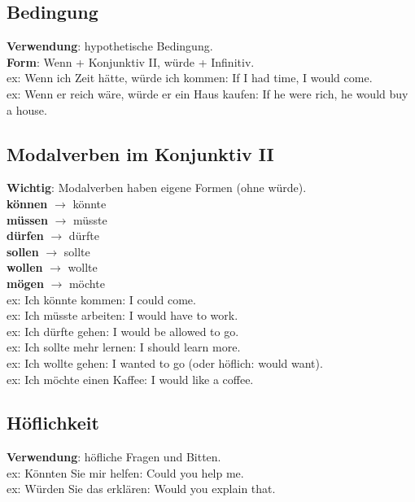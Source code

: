 \documentclass[a4paper]{article}
\begin{document}
        \subsection{Bedingung}
            \textbf{Verwendung}: hypothetische Bedingung.\\
            \textbf{Form}: Wenn + Konjunktiv II, würde + Infinitiv.\\
            ex: Wenn ich Zeit hätte, würde ich kommen: If I had time, I would come.\\
            ex: Wenn er reich wäre, würde er ein Haus kaufen: If he were rich, he would buy a house.\\
        
        \subsection{Modalverben im Konjunktiv II}
            \textbf{Wichtig}: Modalverben haben eigene Formen (ohne würde).\\
            \textbf{können} $\rightarrow$ könnte\\
            \textbf{müssen} $\rightarrow$ müsste\\
            \textbf{dürfen} $\rightarrow$ dürfte\\
            \textbf{sollen} $\rightarrow$ sollte\\
            \textbf{wollen} $\rightarrow$ wollte\\
            \textbf{mögen} $\rightarrow$ möchte\\
            ex: Ich könnte kommen: I could come.\\
            ex: Ich müsste arbeiten: I would have to work.\\
            ex: Ich dürfte gehen: I would be allowed to go.\\
            ex: Ich sollte mehr lernen: I should learn more.\\
            ex: Ich wollte gehen: I wanted to go (oder höflich: would want).\\
            ex: Ich möchte einen Kaffee: I would like a coffee.\\
        
        \subsection{Höflichkeit}
            \textbf{Verwendung}: höfliche Fragen und Bitten.\\
            ex: Könnten Sie mir helfen: Could you help me.\\
            ex: Würden Sie das erklären: Would you explain that.\\
        
\end{document}
